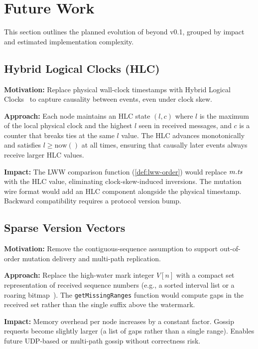 \section{Future Work}
\label{sec:future}

This section outlines the planned evolution of \pebble{} beyond v0.1, grouped
by impact and estimated implementation complexity.

\subsection{Hybrid Logical Clocks (HLC)}

\textbf{Motivation:} Replace physical wall-clock timestamps with Hybrid Logical
Clocks~\cite{kulkarni2014hlc} to capture causality between events, even under
clock skew.

\textbf{Approach:} Each node maintains an HLC state $(l, c)$ where $l$ is the
maximum of the local physical clock and the highest $l$ seen in received
messages, and $c$ is a counter that breaks ties at the same $l$ value. The HLC
advances monotonically and satisfies $l \geq \mathrm{now}()$ at all times,
ensuring that causally later events always receive larger HLC values.

\textbf{Impact:} The LWW comparison function (\cref{def:lww-order}) would
replace $m.\mathit{ts}$ with the HLC value, eliminating clock-skew-induced inversions.
The mutation wire format would add an HLC component alongside the physical
timestamp. Backward compatibility requires a protocol version bump.

\subsection{Sparse Version Vectors}

\textbf{Motivation:} Remove the contiguous-sequence assumption to support
out-of-order mutation delivery and multi-path replication.

\textbf{Approach:} Replace the high-water mark integer $V[n]$ with a compact
set representation of received sequence numbers (e.g., a sorted interval list
or a roaring bitmap~\cite{riak2010}). The \texttt{getMissingRanges} function
would compute gaps in the received set rather than the single suffix above the
watermark.

\textbf{Impact:} Memory overhead per node increases by a constant factor. Gossip
requests become slightly larger (a list of gaps rather than a single range).
Enables future UDP-based or multi-path gossip without correctness risk.

